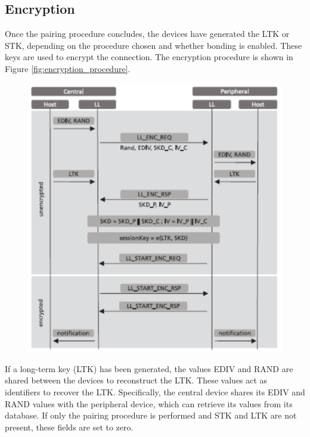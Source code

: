 \documentclass{Configuration_Files/PoliMi3i_thesis}
\begin{document}
\subsection{Encryption}

Once the pairing procedure concludes, the devices have generated the LTK or STK, depending on the procedure chosen and whether bonding is enabled. These keys are used to encrypt the connection. The encryption procedure is shown in Figure \ref{fig:encryption_procedure}.

\begin{figure}[H]
    \centering
    \includegraphics[scale=0.7]{Bluetooth_Security/9.png}
    \label{fig:pairing_procedure}
\end{figure}

If a long-term key (LTK) has been generated, the values EDIV and RAND are shared between the devices to reconstruct the LTK. These values act as identifiers to recover the LTK. Specifically, the central device shares its EDIV and RAND values with the peripheral device, which can retrieve its values from its database. If only the pairing procedure is performed and STK and LTK are not present, these fields are set to zero. 
\end{document}
